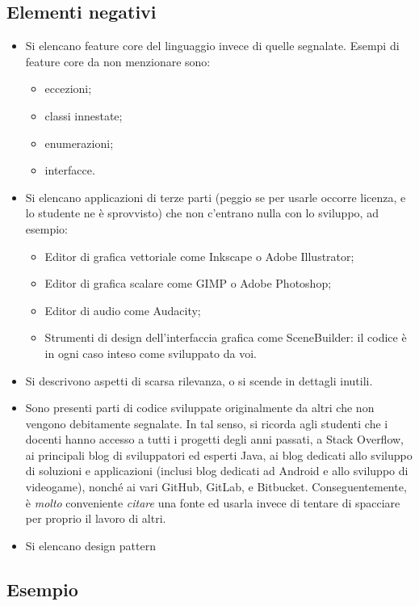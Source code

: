\documentclass[a4paper,12pt]{report}
\begin{document}
\subsection*{Elementi negativi}
\begin{itemize}
	\item Si elencano feature core del linguaggio invece di quelle segnalate. Esempi di feature core da non menzionare sono:
    \begin{itemize}
        \item eccezioni;
        \item classi innestate;
        \item enumerazioni;
        \item interfacce.
    \end{itemize}
	\item Si elencano applicazioni di terze parti (peggio se per usarle occorre licenza, e lo studente ne è sprovvisto) che non c'entrano nulla con lo sviluppo, ad esempio:
    \begin{itemize}
        \item Editor di grafica vettoriale come Inkscape o Adobe Illustrator;
        \item Editor di grafica scalare come GIMP o Adobe Photoshop;
        \item Editor di audio come Audacity;
        \item Strumenti di design dell'interfaccia grafica come SceneBuilder: il codice è in ogni caso inteso come sviluppato da voi.
    \end{itemize}
	\item Si descrivono aspetti di scarsa rilevanza, o si scende in dettagli inutili.
	\item Sono presenti parti di codice sviluppate originalmente da altri che non vengono debitamente segnalate.
	In tal senso, si ricorda agli studenti che i docenti hanno accesso a tutti i progetti degli anni passati,
	a Stack Overflow,
	ai principali blog di sviluppatori ed esperti Java,
	ai blog dedicati allo sviluppo di soluzioni e applicazioni
	(inclusi blog dedicati ad Android e allo sviluppo di videogame),
	nonché ai vari GitHub, GitLab, e Bitbucket.
	Conseguentemente, è \emph{molto} conveniente \emph{citare} una fonte ed usarla invece di tentare di spacciare per proprio il lavoro di altri.
	\item Si elencano design pattern
\end{itemize}

\subsection{Esempio}
\end{document}
